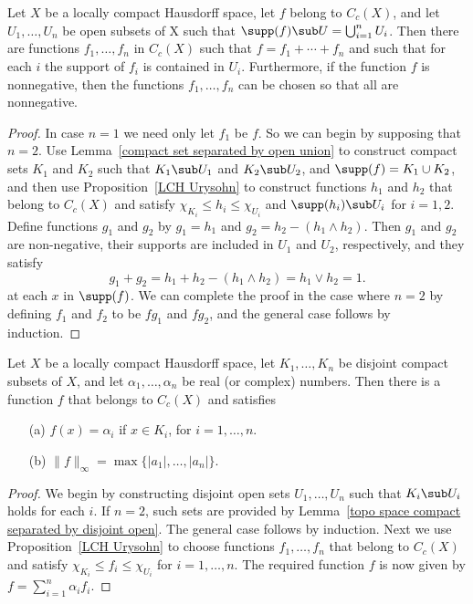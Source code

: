 \begin{proposition}\label{LCH decompose function with supp in open set}
Let $X$ be a locally compact Hausdorff space, let $f$ belong to $C_c(X)$, and let $U_1,\dots,U_n$ be open subsets of X such that $\supp(f)\sub U=\bigcup_{i=1}^{n}U_i$. Then there are functions $f_1,\dots,f_n$ in $C_c(X)$ such that $f=f_1+\cdots+f_n$ and such that for each $i$ the support of $f_i$ is contained in $U_i$. Furthermore, if the function $f$ is nonnegative, then the functions $f_1,\dots,f_n$ can be chosen so that all are nonnegative.
\end{proposition}
\begin{proof}
In case $n=1$ we need only let $f_1$ be $f$. So we can begin by supposing that $n=2$. Use Lemma~\ref{compact set separated by open union} to construct compact sets $K_1$ and $K_2$ such that $K_1\sub U_1$ and $K_2\sub U_2$, and $\supp(f)=K_1\cup K_2$, and then use Proposition~\ref{LCH Urysohn} to construct functions $h_1$ and $h_2$ that belong to $C_c(X)$ and satisfy $\chi_{K_i}\leq h_i\leq\chi_{U_i}$ and $\supp(h_i)\sub U_i$ for $i=1,2$. Define functions $g_1$ and $g_2$ by $g_1=h_1$ and $g_2=h_2-(h_1\wedge h_2)$. Then $g_1$ and $g_2$ are non-negative, their supports are included in $U_1$ and $U_2$, respectively, and they satisfy
\[g_1+g_2=h_1+h_2-(h_1\wedge h_2)=h_1\vee h_2=1.\]
at each $x$ in $\supp(f)$. We can complete the proof in the case where $n=2$ by defining $f_1$ and $f_2$ to be $fg_1$ and $fg_2$, and the general case follows by induction.
\end{proof}
\begin{proposition}\label{LCH function fixed finite value}
Let $X$ be a locally compact Hausdorff space, let $K_1,\dots,K_n$ be disjoint compact subsets of $X$, and let $\alpha_1,\dots,\alpha_n$ be real (or complex) numbers. Then there is a function $f$ that belongs to $C_c(X)$ and satisfies
\begin{itemize}
\item[(a)] $f(x)=\alpha_i$ if $x\in K_i$, for $i=1,\dots,n$.
\item[(b)] $\|f\|_{\infty}=\max\{|a_1|,\dots,|a_n|\}$.
\end{itemize}
\end{proposition}
\begin{proof}
We begin by constructing disjoint open sets $U_1,\dots,U_n$ such that $K_i\sub U_i$ holds for each $i$. If $n=2$, such sets are provided by Lemma~\ref{topo space compact separated by disjoint open}. The general case follows by induction. Next we use Proposition~\ref{LCH Urysohn} to choose functions $f_1,\dots,f_n$ that belong to $C_c(X)$ and satisfy $\chi_{K_i}\leq f_i\leq\chi_{U_i}$ for $i=1,\dots,n$. The required function $f$ is now given by $f=\sum_{i=1}^{n}\alpha_if_i$.
\end{proof}
